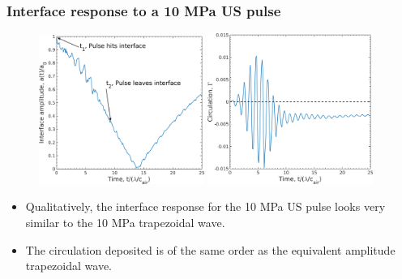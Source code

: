 \begin{frame} \frametitle{\vspace*{0.5cm}Interface response to a 10 MPa US pulse}
  \begin{figure}
    \centering
    \includegraphics[width=0.48\textwidth]{../figs/lung_figs/us_intf_schematic}\hfill
    \includegraphics[width=0.48\textwidth]{../figs/lung_figs/us_circ_schematic}
  \end{figure}
  \begin{itemize}
  \item Qualitatively, the interface response for the 10 MPa US pulse looks very similar to the 10 MPa trapezoidal wave. 
  \item The circulation deposited is of the same order as the equivalent amplitude trapezoidal wave.
  \end{itemize}
\end{frame}
